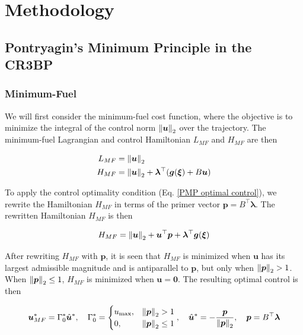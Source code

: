 \documentclass[letterpaper, preprint, paper,11pt]{AAS}	%
\begin{document}
\section{Methodology}

\subsection{Pontryagin's Minimum Principle in the CR3BP}

\subsubsection{Minimum-Fuel}

We will first consider the minimum-fuel cost function, where the objective is to minimize the integral of the control norm $\norm{\bm{u}}_2$ over the trajectory. The minimum-fuel Lagrangian and control Hamiltonian $L_{MF}$ and $H_{MF}$ are then

\begin{align}
    L_{MF} &= \norm{\bm{u}}_2 \\
    H_{MF} &= \norm{\bm{u}}_2 + \bm{\lambda}^\top (\bm{g}(\bm{\xi}) + B\bm{u})
\end{align}

To apply the control optimality condition (Eq. \ref{PMP optimal control}), we rewrite the Hamiltonian $H_{MF}$ in terms of the primer vector $\bm{p} = B^\top \bm{\lambda}$. The rewritten Hamiltonian $H_{MF}$ is then

\begin{equation}
    H_{MF} = \norm{\bm{u}}_2 + \bm{u}^\top \bm{p} + \bm{\lambda}^\top \bm{g}(\bm{\xi})
\end{equation}

After rewriting $H_{MF}$ with $\bm{p}$, it is seen that $H_{MF}$ is minimized when $\bm{u}$ has its largest admissible magnitude and is antiparallel to $\bm{p}$, but only when $\norm{\bm{p}}_2 > 1$. When $\norm{\bm{p}}_2 \le 1$, $H_{MF}$ is minimized when $\bm{u} = \bm{0}$. The resulting optimal control is then

\begin{equation}
    \bm{u}_{MF}^* = \Gamma^*_0 \hat{\bm{u}}^*, \quad \Gamma^*_0 = \begin{cases}
        u_{\text{max}}, & \norm{\bm{p}}_2 > 1 \\
        0, & \norm{\bm{p}}_2 \le 1
    \end{cases}, \quad \hat{\bm{u}}^* = -\frac{\bm{p}}{\norm{\bm{p}}_2}, \quad \bm{p} = B^\top \bm{\lambda} \label{eq:min-fuel control}
\end{equation}
\end{document}

